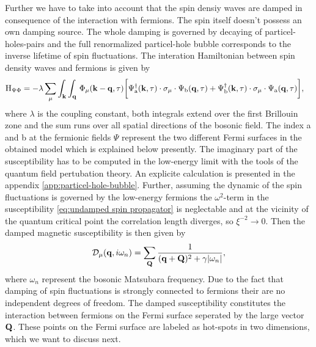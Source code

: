 Further we have to take into account that the spin densiy waves are damped in consequence of the interaction with fermions.
The spin itself doesn't possess an own damping source.
The whole damping is governed by decaying of particel-holes-pairs and the full renormalized particel-hole bubble corresponds to the inverse lifetime of spin fluctuations.
The interation Hamiltonian between spin density waves and fermions is given by
%
\begin{align}
	\mathrm{H}_{\Psi\Phi} &= 
		-\lambda \sum\limits_{\mu} \int_{\vb{k}} \int_{\vb{q}}\,
		\Phi_{\mu}(\vb{k}-\vb{q}, \tau)
		\bigg[
			\Psi_{\mathrm{a}}^{\dag}(\vb{k},\tau) \cdot \sigma_{\mu} \cdot \Psi_{\mathrm{b}}(\vb{q},\tau)
			+
			\Psi_{\mathrm{b}}^{\dag}(\vb{k},\tau) \cdot \sigma_{\mu} \cdot \Psi_{\mathrm{a}}(\vb{q},\tau)
		\bigg],
	\label{eq:Hamiltonian interaction}
\end{align}
%
where $\lambda$ is the coupling constant, both integrals extend over the first Brillouin zone and the sum runs over all spatial directions of the bosonic field.
The index a and b at the fermionic fields $\Psi$ represent the two different Fermi surfaces in the obtained model which is explained below presently.
The imaginary part of the susceptibility has to be computed in the low-energy limit with the tools of the quantum field pertubation theory.
An explicite calculation is presented in the appendix \ref{app:particel-hole-bubble}.
Further, assuming the dynamic of the spin fluctuations is governed by the low-energy fermions the $\omega^{2}$-term in the susceptibility \eqref{eq:undamped spin propagator} is neglectable \cite{Abanov&Chubukov&Schmalian} and at the vicinity of the quantum critical point the correlation length diverges, so $\xi^{-2} \to 0$.
Then the damped magnetic susceptibility is then given by
%
\begin{align}
	\mathcal{D}_{\mu}(\vb{q}, i\omega_{n}) = \sum\limits_{\vb{Q}} \frac{1}{(\vb{q}+\vb{Q})^{2} + \gamma|\omega_{n}|},
	\label{eq:undamped spin propagator}
\end{align}
%
where $\omega_{n}$ represent the bosonic Matsubara frequency.
Due to the fact that damping of spin fluctuations is strongly connected to fermions their are no independent degrees of freedom.
The damped susceptibility constitutes the interaction between fermions on the Fermi surface seperated by the large vector $\vb{Q}$.
These points on the Fermi surface are labeled as hot-spots in two dimensions, which we want to discuss next.
%
